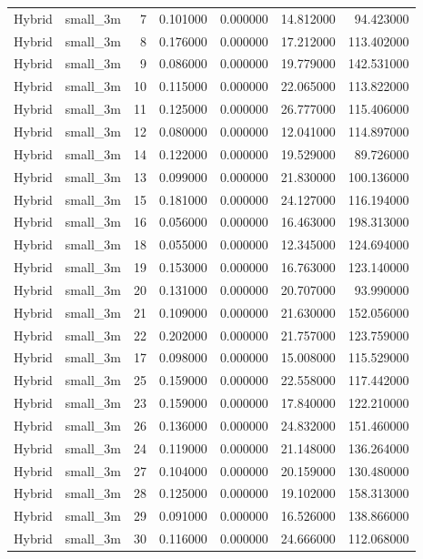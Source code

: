 \begin{tabular}{llrrrrr}
Hybrid & small_3m & 7 & 0.101000 & 0.000000 & 14.812000 & 94.423000 \\
Hybrid & small_3m & 8 & 0.176000 & 0.000000 & 17.212000 & 113.402000 \\
Hybrid & small_3m & 9 & 0.086000 & 0.000000 & 19.779000 & 142.531000 \\
Hybrid & small_3m & 10 & 0.115000 & 0.000000 & 22.065000 & 113.822000 \\
Hybrid & small_3m & 11 & 0.125000 & 0.000000 & 26.777000 & 115.406000 \\
Hybrid & small_3m & 12 & 0.080000 & 0.000000 & 12.041000 & 114.897000 \\
Hybrid & small_3m & 14 & 0.122000 & 0.000000 & 19.529000 & 89.726000 \\
Hybrid & small_3m & 13 & 0.099000 & 0.000000 & 21.830000 & 100.136000 \\
Hybrid & small_3m & 15 & 0.181000 & 0.000000 & 24.127000 & 116.194000 \\
Hybrid & small_3m & 16 & 0.056000 & 0.000000 & 16.463000 & 198.313000 \\
Hybrid & small_3m & 18 & 0.055000 & 0.000000 & 12.345000 & 124.694000 \\
Hybrid & small_3m & 19 & 0.153000 & 0.000000 & 16.763000 & 123.140000 \\
Hybrid & small_3m & 20 & 0.131000 & 0.000000 & 20.707000 & 93.990000 \\
Hybrid & small_3m & 21 & 0.109000 & 0.000000 & 21.630000 & 152.056000 \\
Hybrid & small_3m & 22 & 0.202000 & 0.000000 & 21.757000 & 123.759000 \\
Hybrid & small_3m & 17 & 0.098000 & 0.000000 & 15.008000 & 115.529000 \\
Hybrid & small_3m & 25 & 0.159000 & 0.000000 & 22.558000 & 117.442000 \\
Hybrid & small_3m & 23 & 0.159000 & 0.000000 & 17.840000 & 122.210000 \\
Hybrid & small_3m & 26 & 0.136000 & 0.000000 & 24.832000 & 151.460000 \\
Hybrid & small_3m & 24 & 0.119000 & 0.000000 & 21.148000 & 136.264000 \\
Hybrid & small_3m & 27 & 0.104000 & 0.000000 & 20.159000 & 130.480000 \\
Hybrid & small_3m & 28 & 0.125000 & 0.000000 & 19.102000 & 158.313000 \\
Hybrid & small_3m & 29 & 0.091000 & 0.000000 & 16.526000 & 138.866000 \\
Hybrid & small_3m & 30 & 0.116000 & 0.000000 & 24.666000 & 112.068000 \\

\end{tabular}
